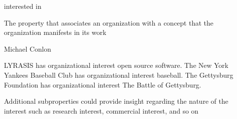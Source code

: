 \documentclass[letterpaper,10pt,english]{sphinxmanual}
\begin{document}
\begin{sphinxShadowBox}

\sphinxAtStartPar
interested in
\end{sphinxShadowBox}

\begin{sphinxShadowBox}

\sphinxAtStartPar
{}
\end{sphinxShadowBox}

\begin{sphinxShadowBox}

\sphinxAtStartPar
The property that associates an organization with a concept that the organization manifests in its work
\end{sphinxShadowBox}

\begin{sphinxShadowBox}

\sphinxAtStartPar
Michael Conlon 
\end{sphinxShadowBox}

\begin{sphinxShadowBox}

\sphinxAtStartPar
{\hyperref[\detokenize{doc-ORG_0000001::doc}]{}}
\end{sphinxShadowBox}

\begin{sphinxShadowBox}

\sphinxAtStartPar
{}
\end{sphinxShadowBox}

\begin{sphinxShadowBox}

\sphinxAtStartPar
LYRASIS has organizational interest open source software.  The New York Yankees Baseball Club has organizational interest baseball.  The Gettysburg Foundation has organizational interest The Battle of Gettysburg.
\end{sphinxShadowBox}

\begin{sphinxShadowBox}

\sphinxAtStartPar
Additional subproperties could provide insight regarding the nature of the interest such as research interest, commercial interest, and so on
\end{sphinxShadowBox}
\end{document}
